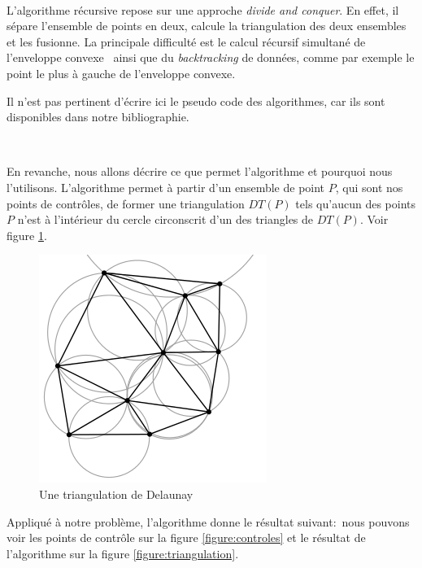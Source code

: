 	~	
	
	L'algorithme récursive repose sur une approche \textit{divide and conquer}.
	En effet, il sépare l'ensemble de points en deux, calcule la triangulation
	des deux ensembles et les fusionne. La principale difficulté est le calcul
	récursif simultané de l'enveloppe convexe~\cite{convexe} ainsi que du
	\textit{backtracking} de données, comme par exemple le point le plus à
	gauche de l'enveloppe convexe.
	
	Il n'est pas pertinent d'écrire ici le pseudo code des
	algorithmes, car ils sont disponibles dans notre bibliographie.
	
	~	
	
	En revanche, nous allons décrire ce que permet l'algorithme et pourquoi
	nous l'utilisons. L'algorithme permet à partir d'un ensemble de point $P$,
	qui sont nos points de contrôles, de former une triangulation $DT(P)$ tels
	qu'aucun des points $P$ n'est à l'intérieur du cercle circonscrit d'un des
	triangles de $DT(P)$. Voir figure \ref{figure:triangles}.
			
	\begin{figure}[!h]
	\centering
	\includegraphics[scale=0.6]{contents/img/triangles.png}
	\caption{Une triangulation de Delaunay}
	\label{figure:triangles}
	\end{figure}
		
	Appliqué à notre problème, l'algorithme donne le résultat suivant:~nous
	pouvons voir les points de contrôle sur la figure \ref{figure:controles} et
	le résultat de l'algorithme sur la figure \ref{figure:triangulation}.
	
